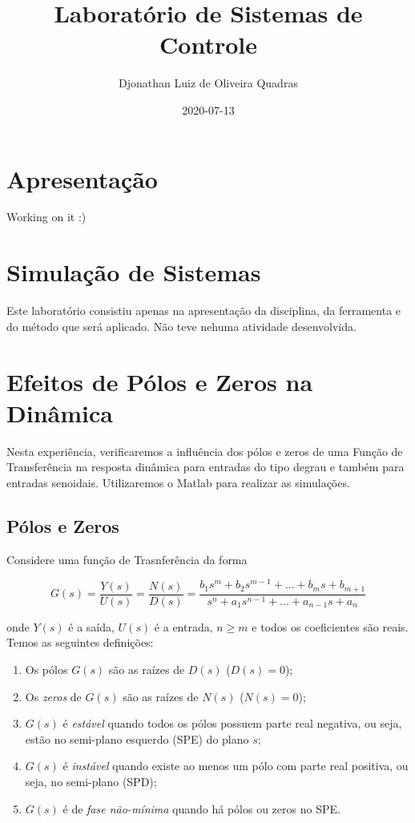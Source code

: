 \documentclass[
]{book}
\title{Laboratório de Sistemas de Controle}
\author{Djonathan Luiz de Oliveira Quadras}
\date{2020-07-13}
\providecommand{\tightlist}{%
  \setlength{\itemsep}{0pt}\setlength{\parskip}{0pt}}
\theoremstyle{definition}
\theoremstyle{definition}
\theoremstyle{definition}
\theoremstyle{remark}
\begin{document}
\maketitle

{
\setcounter{tocdepth}{1}
\tableofcontents
}
\hypertarget{apresentauxe7uxe3o}{%
\chapter*{Apresentação}\label{apresentauxe7uxe3o}}

Working on it :)

\hypertarget{simulauxe7uxe3o-de-sistemas}{%
\chapter{Simulação de Sistemas}\label{simulauxe7uxe3o-de-sistemas}}

Este laboratório consistiu apenas na apresentação da disciplina, da ferramenta e do método que será aplicado. Não teve nehuma atividade desenvolvida.

\hypertarget{lab2}{%
\chapter{Efeitos de Pólos e Zeros na Dinâmica}\label{lab2}}

Nesta experiência, verificaremos a influência dos pólos e zeros de uma Função de Transferência na resposta dinâmica para entradas do tipo degrau e também para entradas senoidais. Utilizaremos o Matlab para realizar as
simulações.

\hypertarget{puxf3los-e-zeros}{%
\section{Pólos e Zeros}\label{puxf3los-e-zeros}}

Considere uma função de Trasnferência da forma

\[
G(s) = \frac{Y(s)}{U(s)} = \frac{N(s)}{D(s)} = \frac{b_1s^m +b_2s^{m-1} + \dots + b_ms + b_{m+1}}{s^n + a_1s^{n-1}+ \dots + a_{n-1}s + a_n}
\]

onde \(Y(s)\) é a saída, \(U(s)\) é a entrada, \(n \geq m\) e todos os coeficientes são reais. Temos as seguintes definições:

\begin{enumerate}
\def\labelenumi{\arabic{enumi}.}
\tightlist
\item
  Os pólos \(G(s)\) são as raízes de \(D(s)\) (\(D(s) = 0\));
\item
  Os \emph{zeros} de \(G(s)\) são as raízes de \(N(s)\) (\(N(s) = 0\));
\item
  \(G(s)\) é \emph{estável} quando todos os pólos possuem parte real negativa, ou seja, estão no semi-plano esquerdo (SPE) do plano \(s\);
\item
  \(G(s)\) é \emph{instável} quando existe ao menos um pólo com parte real positiva, ou seja, no semi-plano (SPD);
\item
  \(G(s)\) é de \emph{fase não-mínima} quando há pólos ou zeros no SPE.
\end{enumerate}
\end{document}
